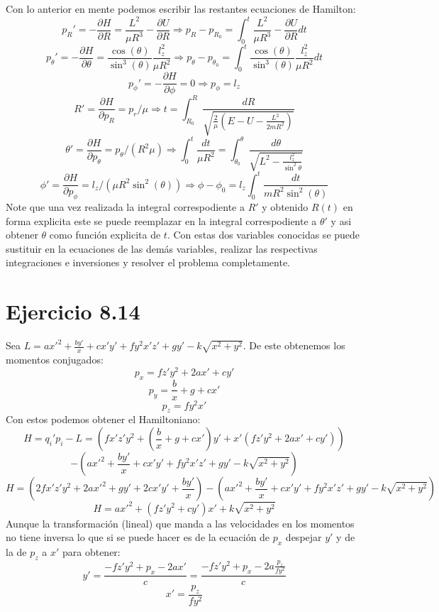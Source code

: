 \documentclass[letterpaper,10pt]{article}
\begin{document}
Con lo anterior en mente podemos escribir las restantes ecuaciones de Hamilton:
$$p_R'=-\frac{\partial H}{\partial R}=\frac{L^2}{\mu R^3}-\frac{\partial U}{\partial R}\Rightarrow p_R-p_{R_0}=\int_{0}^{t} \frac{L^2}{\mu R^3}-\frac{\partial U}{\partial R} dt$$
$$p_\theta'=-\frac{\partial H}{\partial \theta}=\frac{\cos(\theta)}{\sin^3(\theta)}\frac{l_z^2}{\mu R^2}\Rightarrow p_\theta-p_{\theta_0}=\int_{0}^{t} \frac{\cos(\theta)}{\sin^3(\theta)}\frac{l_z^2}{\mu R^2} dt$$
$$p_\phi'=-\frac{\partial H}{\partial \phi}=0\Rightarrow p_\phi=l_z$$
$$R'=\frac{\partial H}{\partial p_R}=p_r/\mu \Rightarrow t=\int_{R_0}^{R} \frac{dR}{\sqrt{\frac{2 }{\mu}(E-U-\frac{L^2}{2mR^2})}}$$
$$\theta'=\frac{\partial H}{\partial p_\theta}=p_\theta/(R^2 \mu)\Rightarrow \int_0^t \frac{dt}{\mu R^2}=\int_{\theta_0}^{\theta}\frac{d\theta}{\sqrt{L^2-\frac{l_z^2}{\sin^2{\theta}}}}$$
$$\phi'=\frac{\partial H}{\partial p_\phi}=l_z/(\mu R^2 \sin^2(\theta))\Rightarrow \phi-\phi_0=l_z \int_0^t \frac{dt}{m R^2 \sin^2(\theta)}$$
Note que una vez realizada la integral correspodiente a $R'$ y obtenido $R(t)$ en forma explicita este se puede reemplazar en la integral correspodiente a $\theta'$ y asi obtener $\theta$ como funci\'on explicita de $t$. Con estas dos variables conocidas se puede sustituir en la ecuaciones de las dem\'as variables, realizar las respectivas integraciones e inversiones y resolver el problema completamente.




\section*{Ejercicio 8.14}
Sea $L=a x'^2+\frac{b y'}{x}+c x' y'+ f y^2x' z' +g y'-k \sqrt{x^2+y^2}$. De este obtenemos los momentos conjugados:
$$p_x=f z' y^2+2 a x'+c y'$$
$$p_y=\frac{b}{x}+g+c x'$$ 
$$p_z=f y^2 x'$$
Con estos podemos obtener el Hamiltoniano:
$$
H=q_i' p_i-L=(f x' z' y^2+\left(\frac{b}{x}+g+c x'\right) y'+x' \left(f z' y^2+2 a x'+c y'\right))$$ $$-(a x'^2+\frac{b y'}{x}+c x' y'+ f y^2x' z' +g y'-k \sqrt{x^2+y^2})$$ $$
H=(2 f x' z' y^2+2 a x'^2+g y'+2 c x' y'+\frac{b y'}{x})-(a x'^2+\frac{b y'}{x}+c x' y'+ f y^2x' z' +g y'-k \sqrt{x^2+y^2})$$ $$
H=a x'^2+\left(f z' y^2+c y'\right) x'+k \sqrt{x^2+y^2}
$$
Aunque la transformaci\'on (lineal) que manda a las velocidades en los momentos no tiene inversa lo que si se puede hacer es de la ecuaci\'on de $p_x$ despejar $y'$ y de la de $p_z$ a $x'$ para obtener:
$$
y'=\frac{-f z' y^2+p_x-2 a x'}{c}=\frac{-f z' y^2+p_x-2 a \frac{p_z}{f y^2}}{c}$$ $$
x'=\frac{p_z}{f y^2}
$$
\end{document}
